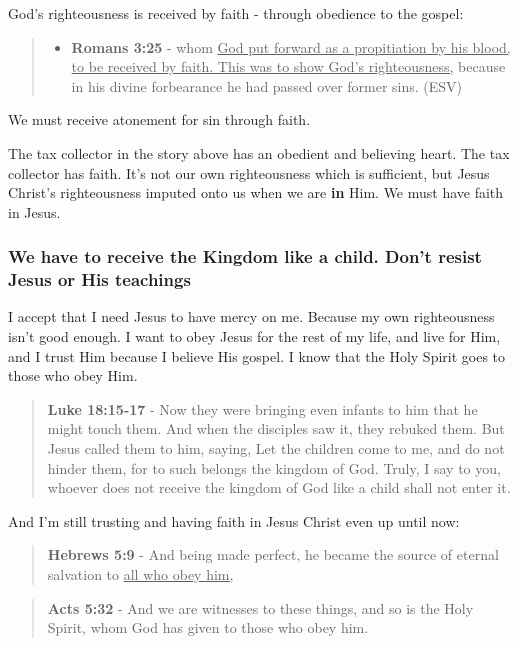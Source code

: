 \documentclass[11pt]{article}
\begin{document}
God's righteousness is received by faith - through obedience to the gospel:

\begin{quote}
\begin{itemize}
\item \textbf{Romans 3:25} -  whom \uline{God put forward as a propitiation by his blood, to be received by faith.  This was to show God's righteousness,} because in his divine forbearance he had passed over former sins.  (ESV)
\end{itemize}
\end{quote}

We must receive atonement for sin through faith.

The tax collector in the story above has an obedient and believing heart. The tax collector has faith. It's not our own righteousness which is sufficient, but Jesus Christ's righteousness imputed onto us when we are \textbf{in} Him. We must have faith in Jesus.

\subsubsection{We have to receive the Kingdom like a child. Don't resist Jesus or His teachings}
\label{sec:orgbc7a195}
I accept that I need Jesus to have mercy on me. Because my own righteousness isn't good enough. I want to obey Jesus for the rest of my life, and live for Him, and I trust Him because I believe His gospel. I know that the Holy Spirit goes to those who obey Him.

\begin{quote}
\textbf{Luke 18:15-17} - Now they were bringing even infants to him that he might touch them. And when the disciples saw it, they rebuked them. But Jesus called them to him, saying, Let the children come to me, and do not hinder them, for to such belongs the kingdom of God. Truly, I say to you, whoever does not receive the kingdom of God like a child shall not enter it.
\end{quote}

And I'm still trusting and having faith in Jesus Christ even up until now:

\begin{quote}
\textbf{Hebrews 5:9} - And being made perfect, he became the source of eternal salvation to \uline{all who obey him,}
\end{quote}

\begin{quote}
\textbf{Acts 5:32} - And we are witnesses to these things, and so is the Holy Spirit, whom God has given to those who obey him.
\end{quote}
\end{document}
